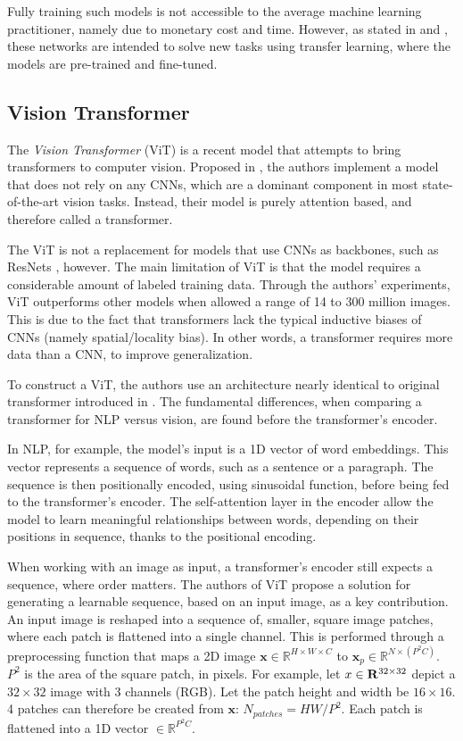 \documentclass[a4paper,11pt]{article}
\begin{document}
Fully training such models is not accessible to the average machine learning practitioner, namely due to monetary cost and time. However, as stated in \cite{kolesnikov2020big} and \cite{dosovitskiy2020image}, these networks are intended to solve new tasks using transfer learning, where the models are pre-trained and fine-tuned. 

\subsection{Vision Transformer}
The \textit{Vision Transformer} (ViT) is a recent model that attempts to bring transformers \cite{vaswani2017attention} to computer vision. Proposed in \cite{dosovitskiy2020image}, the authors implement a model that does not rely on any CNNs, which are a dominant component in most state-of-the-art vision tasks. Instead, their model is purely attention based, and therefore called a transformer. 

The ViT is not a replacement for models that use CNNs as backbones, such as ResNets \cite{he2015deep}, however. The main limitation of ViT is that the model requires a considerable amount of labeled training data. Through the authors' experiments, ViT outperforms other models when allowed a range of 14 to 300 million images. This is due to the fact that transformers lack the typical inductive biases of CNNs (namely spatial/locality bias). In other words, a transformer requires more data than a CNN, to improve generalization. 

To construct a ViT, the authors use an architecture nearly identical to original transformer introduced in \cite{vaswani2017attention}. The fundamental differences, when comparing a transformer for NLP versus vision, are found before the transformer's encoder. 

In NLP, for example, the model's input is a 1D vector of word embeddings. This vector represents a sequence of words, such as a sentence or a paragraph. The sequence is then positionally encoded, using sinusoidal function, before being fed to the transformer's encoder. The self-attention layer in the encoder allow the model to learn meaningful relationships between words, depending on their positions in sequence, thanks to the positional encoding.

When working with an image as input, a transformer's encoder still expects a sequence, where order matters. The authors of ViT propose a solution for generating a learnable sequence, based on an input image, as a key contribution. An input image is reshaped into a sequence of, smaller, square image patches, where each patch is flattened into a single channel. This is performed through a preprocessing function that maps a 2D image $\mathbf{x} \in \mathbb{R}^{H \times W \times C}$ to $\mathbf{x}_p \in \mathbb{R}^{N \times (P^2C)}$. $P^2$ is the area of the square patch, in pixels. For example, let $x \in \mathbf{R}^{32\times32\time3}$ depict a $32\times32$ image with 3 channels (RGB). Let the patch height and width be $16\times16$. 4 patches can therefore be created from $\mathbf{x}$: $N_{patches} = HW/P^2$. Each patch is flattened into a 1D vector $\in \mathbb{R}^{P^2C}$.
\end{document}
